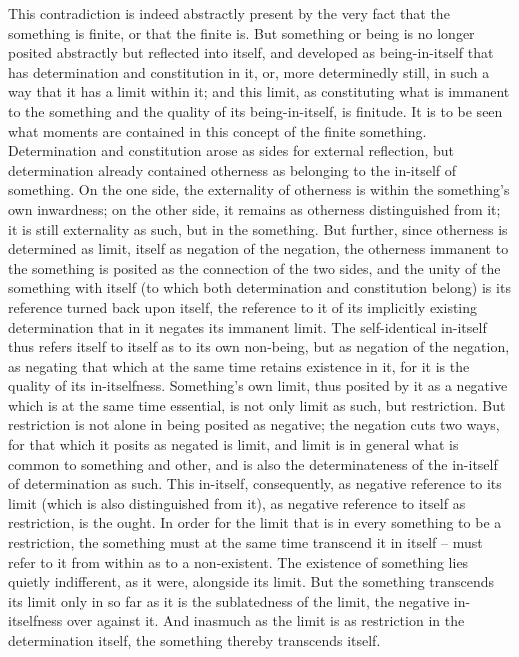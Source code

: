 This contradiction is indeed abstractly present by the very fact that the
something is finite, or that the finite is. But something or being is no longer
posited abstractly but reflected into itself, and developed as being-in-itself
that has determination and constitution in it, or, more determinedly still,
in such a way that it has a limit within it; and this limit, as constituting
what is immanent to the something and the quality of its being-in-itself,
is finitude. It is to be seen what moments are contained in this concept of
the finite something.
Determination and constitution arose as sides for external reflection,
but determination already contained otherness as belonging to the in-itself
of something. On the one side, the externality of otherness is within the
something’s own inwardness; on the other side, it remains as otherness
distinguished from it; it is still externality as such, but in the something.
But further, since otherness is determined as limit, itself as negation of
the negation, the otherness immanent to the something is posited as the
connection of the two sides, and the unity of the something with itself (to
which both determination and constitution belong) is its reference turned
back upon itself, the reference to it of its implicitly existing determination
that in it negates its immanent limit. The self-identical in-itself thus refers
itself to itself as to its own non-being, but as negation of the negation, as
negating that which at the same time retains existence in it, for it is the
quality of its in-itselfness. Something’s own limit, thus posited by it as a
negative which is at the same time essential, is not only limit as such, but
restriction. But restriction is not alone in being posited as negative; the
negation cuts two ways, for that which it posits as negated is limit, and
limit is in general what is common to something and other, and is also
the determinateness of the in-itself of determination as such. This in-itself,
consequently, as negative reference to its limit (which is also distinguished
from it), as negative reference to itself as restriction, is the ought.
In order for the limit that is in every something to be a restriction, the
something must at the same time transcend it in itself – must refer to it
from within as to a non-existent. The existence of something lies quietly
indifferent, as it were, alongside its limit. But the something transcends
its limit only in so far as it is the sublatedness of the limit, the negative
in-itselfness over against it. And inasmuch as the limit is as restriction in
the determination itself, the something thereby transcends itself.
